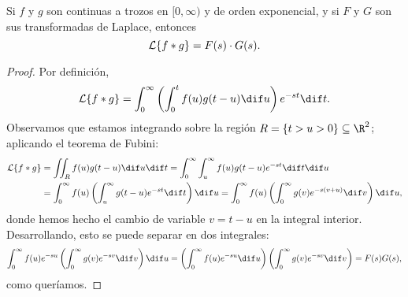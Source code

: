 \documentclass[../main.tex]{subfiles}
\begin{document}
\begin{theorem}
  Si \(f\) y \(g\) son continuas a trozos en \([0,\infty)\) y de orden
  exponencial, y si \(F\) y \(G\) son sus transformadas de Laplace, entonces
  \[\mathcal{L}\{f \ast g\} = F(s) \cdot G(s).\]
  \begin{proof}
    Por definición,
    \[\L\{f \ast g\} = \int_0^\infty \left( \int_0^t f(u)g(t-u) \dif u \right)
      e^{-st} \dif t.\]
    Observamos que estamos integrando sobre la región \(R = \{t > u > 0\} \subseteq
    \R^2\); aplicando el teorema de Fubini:
    \begin{align*}
      \L\{f \ast g\} &= \iint_R f(u) g(t-u) \dif u \dif t = \int_0^\infty
      \int_u^\infty f(u)g(t-u)e^{-st} \dif t \dif u \\
      &= \int_0^\infty f(u) \left( \int_u^\infty g(t-u)e^{-st} \dif t \right)
      \dif u = \int_0^\infty f(u) \left( \int_0^\infty g(v)e^{-s(v+u)} \dif v
        \right) \dif u,
    \end{align*}
    donde hemos hecho el cambio de variable \(v = t-u\) en la integral
    interior. Desarrollando, esto se puede separar en dos integrales:
    \[\int_0^\infty f(u) e^{-su} \left( \int_0^\infty g(v)e^{-sv} \dif v \right) \dif u =
      \left( \int_0^\infty f(u)e^{-su} \dif u \right)
      \left( \int_0^\infty g(v)e^{-sv} \dif v \right) =
      F(s) G(s),\]
    como queríamos.
  \end{proof}
\end{theorem}
\end{document}
